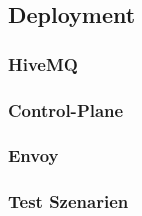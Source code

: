 \subsection{Deployment}
\subsubsection{HiveMQ}
\subsubsection{Control-Plane}
\subsubsection{Envoy}
\subsubsection{Test Szenarien}

\begin{comment}
- Describe the realization of your concepts, in case you have actually developed some-thing.
- Elaborate on the software architecture of your tool, in case you have developed one. Use nested UML packages, components, and interfaces in a component diagram.
- If applicable, show the deploymentof your tool in a production environment. Use UML's deployment diagram notation.
- It must be clear from the architecture, what your thesis contributes and what it takes for granted like existing systems, code bases, libraries and frameworks. For example, you can decorate the components in a UML component diagram that you have implemented and those that you just used.
- Do not delve into ordinary details by, e.g., intensively describing a "p lain old Java-object (POJO)" in all its dreary getter-setter-details. Instead pick some interesting details and de-scribe them, e.g.,
  - if   you made extensive use of a certain design pattern, describe a single concrete appli-cation of it using, e.g., UML class diagrams or
  - if your work involves a complicated conversation pattern or protocol, explained it using a UML sequence diagram, state chart, activity diagram and the like or
  - if you have developed a central and canny algorithm, you may even show its implemen-tation in, e.g., Java code.
- Show how the result of your work actually looks like. In case of a tool, provide some screenshots together with some explanatory text.
- Describe the quantity of your work, e.g., in terms of lines of code or classes etc. Please just count your own hand-crafted code but not previously existing, imported or generated code.
- Describe the quality of your work, e.g., if you have developed a large web application, run some performance tests, depicts results and draw conclusions from them.
\end{comment}
